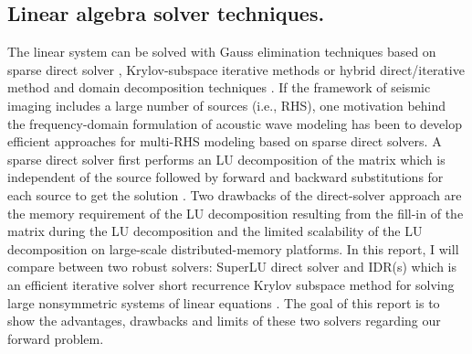 \documentclass[12pt]{article}
\begin{document}
\subsection{Linear algebra solver techniques.}
The linear system can be solved with Gauss elimination techniques based on sparse direct solver \citep{duff1986direct}, Krylov-subspace iterative methods \citep{saad2003iterative} or hybrid direct/iterative method and domain decomposition techniques \citep{smith2004domain}. If the framework of seismic imaging includes a large number of sources (i.e., RHS), one motivation behind the frequency-domain formulation of acoustic wave modeling has been to develop efficient approaches for multi-RHS modeling based on sparse direct solvers. A sparse direct solver first performs an LU decomposition of the matrix which is independent of the source followed by forward and backward substitutions for each source to get the solution \citep{demmel1997applied}. Two drawbacks of the direct-solver approach are the memory requirement of the LU decomposition resulting from the fill-in of the matrix during the LU decomposition and the limited scalability of the LU decomposition on large-scale distributed-memory platforms. In this report, I will compare between two robust solvers: SuperLU direct solver \citep{li2011superlu} and IDR(s) which is an efficient iterative solver short recurrence Krylov subspace method for solving large nonsymmetric systems of linear equations \citep{sonneveld2008idr}. The goal of this report is to show the advantages, drawbacks and limits of these two solvers regarding our forward problem.
\end{document}

